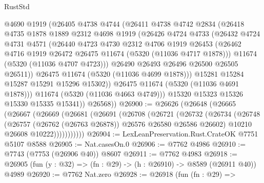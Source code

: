 \begin{lexlean}{RustStd}
\begin{coremodule}
                @4690
                @1919
                (@26405
                  @4738
                  @4744
                  (@26411
                    @4738
                    @4742
                    @2834
                    (@26418
                      @4735
                      @1878
                      @1889
                      @2312
                      @4698
                      @1919
                      (@26426
                        @4724
                        @4733
                        (@26432
                          @4724
                          @4731
                          @4571
                          (@26440
                            @4723
                            @4730
                            @2312
                            @4706
                            @1919
                            @26453
                            (@26462 @4716 @1919 @26472 @26475 @11674 (@5320 (@11036 @4717 @1878)))
                            @11674
                            (@5320 (@11036 @4707 @4723)))
                          @26490
                          @26493
                          @26496
                          @26500
                          @26505
                          @26511))
                      @26475
                      @11674
                      (@5320 (@11036 @4699 @1878)))
                    @15281
                    @15284
                    @15287
                    @15291
                    @15296
                    @15302))
                @26475
                @11674
                (@5320 (@11036 @4691 @1878)))
              @11674
              (@5320 (@11036 @4663 @4749)))
            @15320
            @15323
            @15326
            @15330
            @15335
            @15341))
        @26568))
@26900 := @26626
    (@26648
      (@26665
        (@26667
          (@26669
            (@26681
              (@26691
                (@26708
                  (@26721
                    (@26732
                      (@26734
                        (@26748
                          (@26757 (@26762 (@26763 @26878)) @26576 @26580 @26586 @26602)
                          @10210
                          @26608
                          @10222)))))))))))
@26904 := LexLeanPreservation.Rust.CrateOK @7751 @5107 @8588
@26905 := Nat.casesOn.{0}
@26906 := @7762 @4986
@26910 := @7743 (@7753 (@26906 @40)) @8607
@26911 := @7762 @4983
@26918 := @26905 (fun (y : @32) => (fn : @29) -> (h : @26910) -> @8589 (@26911 @40)) @4989
@26920 := @7762 Nat.zero
@26928 := @26918
    (fun (fn : @29) =>

\end{coremodule}
\end{lexlean}
